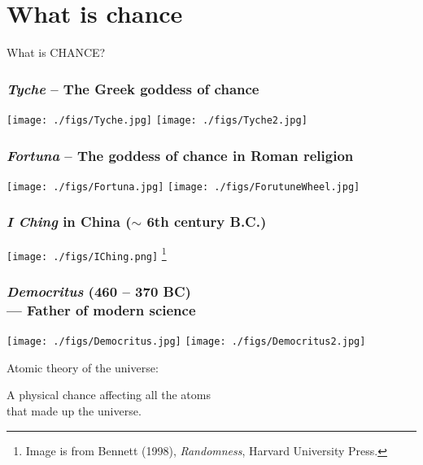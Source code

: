 \documentclass[9pt]{beamer}
\begin{document}
\begin{frame}[noframenumbering] \titlepage
\end{frame}
\begin{frame} \tableofcontents\end{frame}
\section{What is chance}%
\begin{frame}[fragile] %
\begin{center}
  \huge
  What is CHANCE?
\end{center}
\end{frame}
\begin{frame}[fragile,t] %
  \frametitle{{\it Tyche} -- The Greek goddess of chance}
  \begin{center}
    \texttt{[image: ./figs/Tyche.jpg]} \quad
    \texttt{[image: ./figs/Tyche2.jpg]}
  \end{center}
\end{frame}
\begin{frame}[fragile] %
  \frametitle{{\it Fortuna} -- The goddess of chance in Roman religion}
  \begin{center}
    \texttt{[image: ./figs/Fortuna.jpg]} \quad
    \texttt{[image: ./figs/ForutuneWheel.jpg]}
  \end{center}
\end{frame}
\begin{frame}[fragile] %
  \frametitle{{\it I Ching} in China ($\sim$ 6th century B.C.)}
 \begin{center}
   \texttt{[image: ./figs/IChing.png]}
   \footnote{Image is from Bennett (1998), {\it Randomness}, Harvard University Press.}
 \end{center}
\end{frame}
\begin{frame}[fragile] %
  \frametitle{{\it Democritus} (460 -- 370 BC) \\ --- Father of modern science}
  \begin{center}
    \texttt{[image: ./figs/Democritus.jpg]} \qquad
    \texttt{[image: ./figs/Democritus2.jpg]}
    \bigskip


    Atomic theory of the universe:\\ \bigskip

    A physical chance affecting all the atoms\\
    that made up the universe.
  \end{center}
\end{frame}
\end{document}
